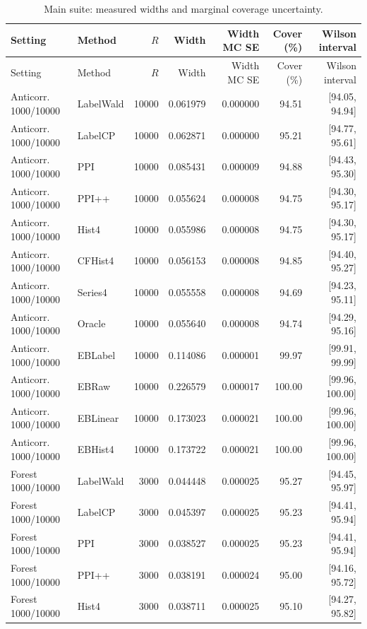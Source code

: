 \begin{longtable}{llrrrrr}
\caption{Main suite: measured widths and marginal coverage uncertainty.}\label{tab:fullmain}\\
\toprule Setting & Method & $R$ & Width & Width MC SE & Cover (\%) & Wilson interval\\\midrule\endfirsthead
\toprule Setting & Method & $R$ & Width & Width MC SE & Cover (\%) & Wilson interval\\\midrule\endhead
Anticorr. 1000/10000 & LabelWald & 10000 & 0.061979 & 0.000000 & 94.51 & [94.05, 94.94]\\
Anticorr. 1000/10000 & LabelCP & 10000 & 0.062871 & 0.000000 & 95.21 & [94.77, 95.61]\\
Anticorr. 1000/10000 & PPI & 10000 & 0.085431 & 0.000009 & 94.88 & [94.43, 95.30]\\
Anticorr. 1000/10000 & PPI++ & 10000 & 0.055624 & 0.000008 & 94.75 & [94.30, 95.17]\\
Anticorr. 1000/10000 & Hist4 & 10000 & 0.055986 & 0.000008 & 94.75 & [94.30, 95.17]\\
Anticorr. 1000/10000 & CFHist4 & 10000 & 0.056153 & 0.000008 & 94.85 & [94.40, 95.27]\\
Anticorr. 1000/10000 & Series4 & 10000 & 0.055558 & 0.000008 & 94.69 & [94.23, 95.11]\\
Anticorr. 1000/10000 & Oracle & 10000 & 0.055640 & 0.000008 & 94.74 & [94.29, 95.16]\\
Anticorr. 1000/10000 & EBLabel & 10000 & 0.114086 & 0.000001 & 99.97 & [99.91, 99.99]\\
Anticorr. 1000/10000 & EBRaw & 10000 & 0.226579 & 0.000017 & 100.00 & [99.96, 100.00]\\
Anticorr. 1000/10000 & EBLinear & 10000 & 0.173023 & 0.000021 & 100.00 & [99.96, 100.00]\\
Anticorr. 1000/10000 & EBHist4 & 10000 & 0.173722 & 0.000021 & 100.00 & [99.96, 100.00]\\
Forest 1000/10000 & LabelWald & 3000 & 0.044448 & 0.000025 & 95.27 & [94.45, 95.97]\\
Forest 1000/10000 & LabelCP & 3000 & 0.045397 & 0.000025 & 95.23 & [94.41, 95.94]\\
Forest 1000/10000 & PPI & 3000 & 0.038527 & 0.000025 & 95.23 & [94.41, 95.94]\\
Forest 1000/10000 & PPI++ & 3000 & 0.038191 & 0.000024 & 95.00 & [94.16, 95.72]\\
Forest 1000/10000 & Hist4 & 3000 & 0.038711 & 0.000025 & 95.10 & [94.27, 95.82]\\

\end{longtable}
